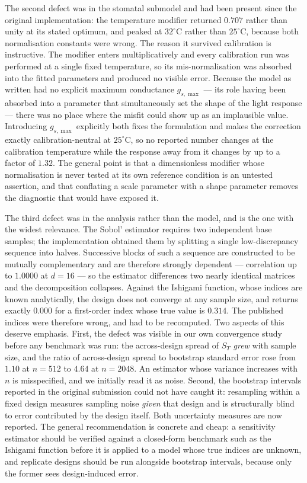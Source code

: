 \documentclass[a4paper,fleqn]{cas-sc}
\begin{document}
The second defect was in the stomatal submodel and had been present since the
original implementation: the temperature modifier returned $0.707$ rather than
unity at its stated optimum, and peaked at $32^{\circ}$C rather than
$25^{\circ}$C, because both normalisation constants were wrong. The reason it
survived calibration is instructive. The modifier enters multiplicatively and
every calibration run was performed at a single fixed temperature, so its
mis-normalisation was absorbed into the fitted parameters and produced no
visible error. Because the model as written had no explicit maximum
conductance $g_{s,\max}$ --- its role having been absorbed into a parameter
that simultaneously set the shape of the light response --- there was no place
where the misfit could show up as an implausible value. Introducing
$g_{s,\max}$ explicitly both fixes the formulation and makes the correction
exactly calibration-neutral at $25^{\circ}$C, so no reported number changes at
the calibration temperature while the response away from it changes by up to
a factor of $1.32$. The general point is that a dimensionless modifier whose
normalisation is never tested at its own reference condition is an untested
assertion, and that conflating a scale parameter with a shape parameter
removes the diagnostic that would have exposed it.

The third defect was in the analysis rather than the model, and is the one
with the widest relevance. The Sobol' estimator requires two independent base
samples; the implementation obtained them by splitting a single
low-discrepancy sequence into halves. Successive blocks of such a sequence are
constructed to be mutually complementary and are therefore strongly
dependent --- correlation up to $1.0000$ at $d=16$ --- so the estimator
differences two nearly identical matrices and the decomposition collapses.
Against the Ishigami function, whose indices are known analytically, the
design does not converge at any sample size, and returns exactly $0.000$ for
a first-order index whose true value is $0.314$. The published indices were
therefore wrong, and had to be recomputed. Two aspects of this deserve
emphasis. First, the defect was visible in our own convergence study before
any benchmark was run: the across-design spread of $S_T$ \emph{grew} with
sample size, and the ratio of across-design spread to bootstrap standard
error rose from $1.10$ at $n=512$ to $4.64$ at $n=2048$. An estimator whose
variance increases with $n$ is misspecified, and we initially read it as
noise. Second, the bootstrap intervals reported in the original submission
could not have caught it: resampling within a fixed design measures sampling
noise \emph{given} that design and is structurally blind to error contributed
by the design itself. Both uncertainty measures are now reported. The general
recommendation is concrete and cheap: a sensitivity estimator should be
verified against a closed-form benchmark such as the Ishigami function before
it is applied to a model whose true indices are unknown, and replicate
designs should be run alongside bootstrap intervals, because only the former
sees design-induced error.
\end{document}
